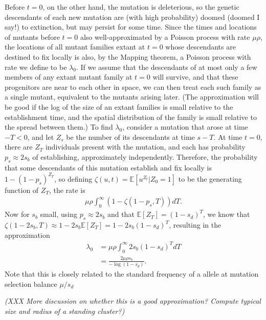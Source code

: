 \documentclass{article}
\newcommand{\plr}[1]{{\it\color{blue}(#1)}}
\newcommand{\E}{\mathbb{E}}
\begin{document}
Before $t=0$, on the other hand, the mutation is deleterious, so the
genetic descendants of each new mutation are (with high probability)
doomed (doomed I say!) to extinction,
but may persist for some time.
Since the times and locations of mutants before $t=0$ also well-approximated by a Poisson process with rate $\mu \rho$,
the locations of all mutant families extant at $t=0$ whose descendants are destined to fix locally is also,
by the Mapping theorem, a Poisson process with rate we define to be $\lambda_0$.
If we assume that the descendants of at most only a few members of any extant mutant family at $t=0$ will survive,
and that these progenitors are near to each other in space, we can then treat each such family as a single mutant,
equivalent to the mutants arising later.
(The approximation will be good if the log of the size of an extant families is small relative to the establishment time,
and the spatial distribution of the family is small relative to the spread between them.)
To find $\lambda_0$, consider a mutation that arose at time $-T<0$, and let $Z_s$ be the number of its descendants at time $s-T$.
At time $t=0$, there are $Z_T$ individuals present with the mutation,
and each has probability $p_s \approx 2s_b$ of establishing, approximately independently.
Therefore, the probability that some descendants of this mutation establish and fix locally is $1-(1-p_s)^{Z_T}$,
so defining $\zeta(u,t) = \E[u^{Z_t} | Z_0=1 ]$ to be the generating function of $Z_T$,
the rate is
\begin{align*}
    \mu \rho \int_0^\infty \left( 1- \zeta(1-p_s,T) \right) dT .
\end{align*}
Now for $s_b$ small, using $p_s \approx 2s_b$ and that $\E[Z_T]=(1-s_d)^T$,
we know that $\zeta(1-2s_b,T) \approx 1-2s_b \E[Z_T] = 1-2s_b (1-s_d)^T$,
resulting in the approximation
\begin{align}
    \lambda_0 &= \mu \rho \int_0^\infty 2s_b (1-s_d)^{T} dT \\
        &= \frac{ 2 \mu \rho s_b }{ -\log(1-s_d) } .
\end{align}
Note that this is closely related to the standard frequency of a
allele at mutation selection balance $\mu/s_d$ \citep{Haldane?}

\plr{XXX More discussion on whether this is a good approximation?  
Compute typical size and radius of a standing cluster?}
\end{document}
